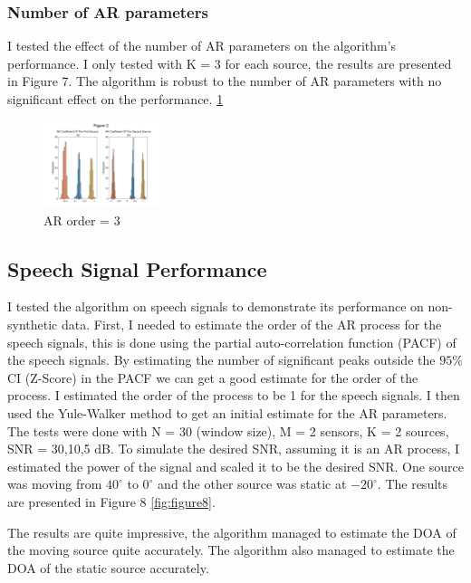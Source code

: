 \documentclass{article}
\begin{document}
\subsubsection{Number of AR parameters}

I tested the effect of the number of AR parameters on the algorithm's performance.
I only tested with K = 3 for each source, the results are presented in Figure 7.
The algorithm is robust to the number of AR parameters with no significant effect on the performance.
\ref{fig:figure7}
\begin{figure}[htbp]
    \centering
    \includegraphics[width=0.3\textwidth]{Fig2_AR3.png}
    \caption[]{AR order = 3}
    \label{fig:figure7}
\end{figure}



\subsection[]{Speech Signal Performance}
I tested the algorithm on speech signals to demonstrate its performance on non-synthetic data.
First, I needed to estimate the order of the AR process for the speech signals, this is done using 
the partial auto-correlation function (PACF) of the speech signals.
By estimating the number of significant peaks outside the $95\%$ CI (Z-Score) in the PACF we can get a good estimate for the order of the process.
I estimated the order of the process to be 1 for the speech signals.
I then used the Yule-Walker method to get an initial estimate for the AR parameters.
The tests were done with N = 30 (window size), M = 2 sensors, K = 2 sources, SNR = 30,10,5 dB.
To simulate the desired SNR, assuming it is an AR process, I estimated the power of the signal and scaled it to be the desired SNR.
One source was moving from $40^\circ$ to $0^\circ$ and the other source was static at $-20^\circ$.
The results are presented in Figure 8 \ref*{fig:figure8}.

The results are quite impressive, the algorithm managed to estimate the DOA of the moving source quite accurately.
The algorithm also managed to estimate the DOA of the static source accurately.
\end{document}

